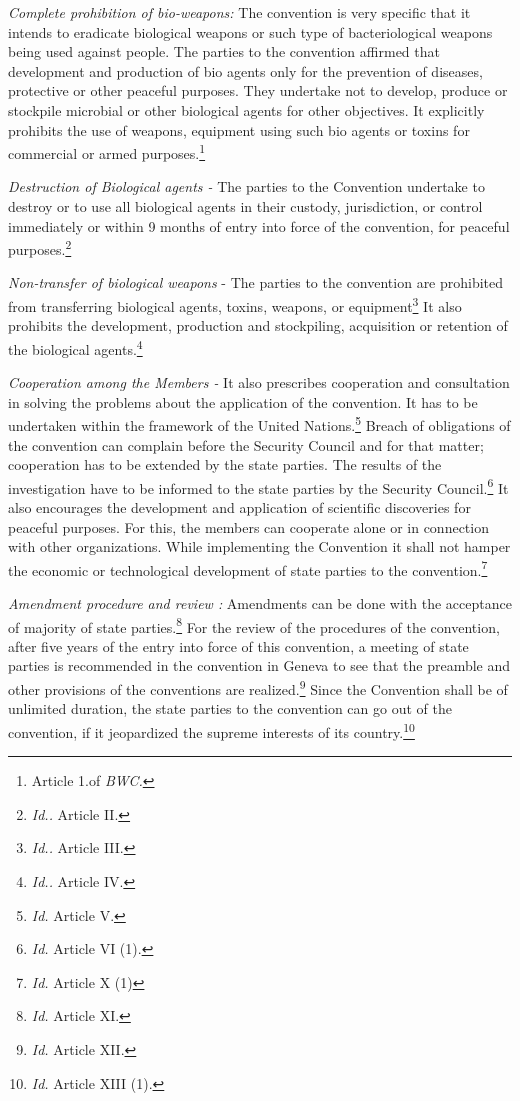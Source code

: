 \begin{multicols}{2}
\noi
\textit{Complete prohibition of bio-weapons:} The convention is very specific that it intends to
eradicate biological weapons or such type of bacteriological weapons being used against
people. The parties to the convention affirmed that development and production of bio agents
only for the prevention of diseases, protective or other peaceful purposes. They undertake not
to develop, produce or stockpile microbial or other biological agents for other objectives. It
explicitly prohibits the use of weapons, equipment using such bio agents or toxins for
commercial or armed purposes.\footnote{Article 1.of \textit{BWC.}}

\noi
\textit{Destruction of Biological agents -} The parties to the Convention undertake to destroy or to use
all biological agents in their custody, jurisdiction, or control immediately or within 9 months
of entry into force of the convention, for peaceful purposes.\footnote{\textit{Id..} Article II.} 

\noi
\textit{Non-transfer of biological weapons} - The parties to the convention are prohibited from
transferring biological agents, toxins, weapons, or equipment\footnote{\textit{Id..} Article III. } It also prohibits the
development, production and stockpiling, acquisition or retention of the biological agents.\footnote{\textit{Id..} Article IV. }

\noi
\textit{Cooperation among the Members -} It also prescribes cooperation and consultation in solving
the problems about the application of the convention. It has to be undertaken within the
framework of the United Nations.\footnote{\textit{Id.} Article V.} Breach of obligations of the convention can complain
before the Security Council and for that matter; cooperation has to be extended by the state
parties. The results of the investigation have to be informed to the state parties by the
Security Council.\footnote{\textit{Id.} Article VI (1).} It also encourages the development and application of scientific
discoveries for peaceful purposes. For this, the members can cooperate alone or in connection 
with other organizations. While implementing the Convention it shall not hamper the
economic or technological development of state parties to the convention.\footnote{\textit{Id.} Article X (1)}

\noi
\textit{Amendment procedure and review :} Amendments can be done with the acceptance of majority
of state parties.\footnote{\textit{Id.} Article XI.} For the review of the procedures of the convention, after five years of the
entry into force of this convention, a meeting of state parties is recommended in the
convention in Geneva to see that the preamble and other provisions of the conventions are
realized.\footnote{\textit{Id.} Article XII.} Since the Convention shall be of unlimited duration, the state parties to the
convention can go out of the convention, if it jeopardized the supreme interests of its
country.\footnote{\textit{Id.} Article XIII (1).}


\end{multicols}

